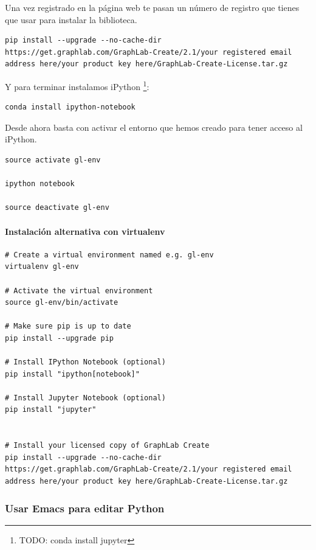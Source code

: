 \documentclass[12pt,spanish,]{article}
\let\oldparagraph\paragraph
\renewcommand{\paragraph}[1]{\oldparagraph{#1}\mbox{}}
\begin{document}
Una vez registrado en la página web te pasan un número de registro que
tienes que usar para instalar la biblioteca.

\begin{verbatim}
pip install --upgrade --no-cache-dir https://get.graphlab.com/GraphLab-Create/2.1/your registered email address here/your product key here/GraphLab-Create-License.tar.gz
\end{verbatim}

Y para terminar instalamos iPython \footnote{TODO: conda install jupyter}:

\begin{verbatim}
conda install ipython-notebook
\end{verbatim}

Desde ahora basta con activar el entorno que hemos creado para tener
acceso al iPython.

\begin{verbatim}
source activate gl-env

ipython notebook

source deactivate gl-env
\end{verbatim}

\paragraph{Instalación alternativa con
virtualenv}\label{instalaciuxf3n-alternativa-con-virtualenv}

\begin{verbatim}
# Create a virtual environment named e.g. gl-env
virtualenv gl-env

# Activate the virtual environment
source gl-env/bin/activate

# Make sure pip is up to date
pip install --upgrade pip

# Install IPython Notebook (optional)
pip install "ipython[notebook]"

# Install Jupyter Notebook (optional)
pip install "jupyter"


# Install your licensed copy of GraphLab Create
pip install --upgrade --no-cache-dir https://get.graphlab.com/GraphLab-Create/2.1/your registered email address here/your product key here/GraphLab-Create-License.tar.gz
\end{verbatim}

\subsubsection{Usar Emacs para editar
Python}\label{usar-emacs-para-editar-python}
\end{document}
